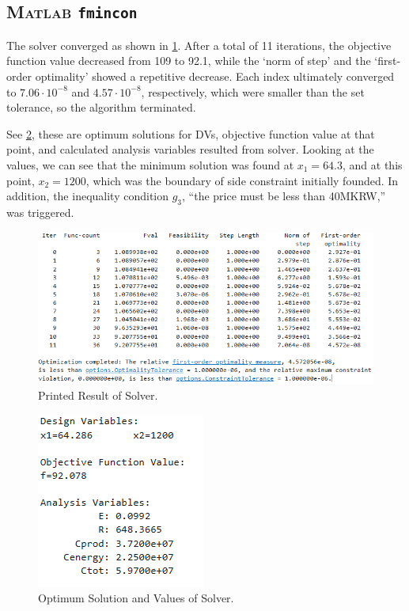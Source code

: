 \documentclass[11pt,twocolumn]{article}
\begin{document}
        \subsection{\textsc{Matlab} \texttt{fmincon}}
            The solver converged as shown in \cref{disp}.
            After a total of 11 iterations, the objective function value decreased from 109 to 92.1, while the `norm of step' and the `first-order optimality' showed a repetitive decrease.
            Each index ultimately converged to $7.06\cdot 10^{-8}$ and $4.57\cdot 10^{-8}$, respectively, which were smaller than the set tolerance, so the algorithm terminated.
            \par
            See \cref{disp2}, these are optimum solutions for DVs, objective function value at that point, and calculated analysis variables resulted from solver.
            Looking at the values, we can see that the minimum solution was found at $x_1=64.3$, and at this point, $x_2 = 1200$, which was the boundary of side constraint initially founded.
            In addition, the inequality condition $g_3$, ``the price must be less than 40MKRW,'' was triggered.
            \begin{figure}[h]
                \centering
                \includegraphics[width=.8\columnwidth]{matlabDisplay.png}
                \caption{Printed Result of Solver.}
                \label{disp}
            \end{figure}
            \begin{figure}[h]
                \centering
                \includegraphics[width=.8\columnwidth]{disp.png}
                \caption{Optimum Solution and Values of Solver.}
                \label{disp2}
            \end{figure}
\end{document}
